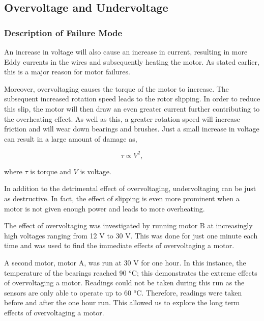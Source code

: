 



\subsection{Overvoltage and Undervoltage}

\subsubsection{Description of Failure Mode}
An increase in voltage will also cause an increase in current, resulting in more Eddy currents in the wires and subsequently heating the motor. As stated earlier, this is a major reason for motor failures. 

Moreover, overvoltaging causes the torque of the motor to increase. The subsequent increased rotation speed leads to the rotor slipping. In order to reduce this slip, the motor will then draw an even greater current further contributing to the overheating effect. As well as this, a greater rotation speed will increase friction and will wear down bearings and brushes. Just a small increase in voltage can result in a large amount of damage as,

\begin{equation}
\tau \propto V^2,
\label{Torque}
\end{equation}

where $\tau$ is torque and $V$ is voltage.

In addition to the detrimental effect of overvoltaging, undervoltaging can be just as destructive. In fact, the effect of slipping is even more prominent when a motor is not given enough power and leads to more overheating.


The effect of overvoltaging  was investigated by running motor B at increasingly high voltages ranging from 12 V to 30 V. This was done for just one minute each time and was used to find the immediate effects of overvoltaging a motor.
    

A second motor, motor A, was run at 30 V for one hour. In this instance, the temperature of the bearings reached 90 $^o$C; this demonstrates the extreme effects of overvoltaging a motor. Readings could not be taken during this run as the sensors are only able to operate %
up to 60 $^o$C. %
Therefore, readings were taken before and after the one hour run. This allowed us to explore the long term effects of overvoltaging a motor.

